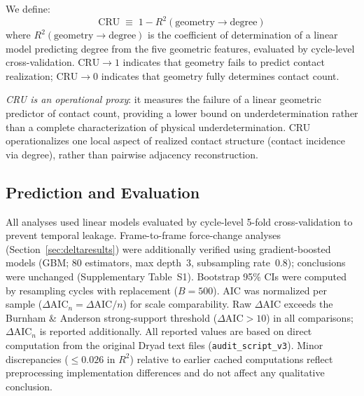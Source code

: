 \documentclass[11pt,a4paper]{article}
\begin{document}
We define:
\begin{equation}
\mathrm{CRU} \;\equiv\; 1 - R^2(\text{geometry} \rightarrow \text{degree})
\end{equation}
where $R^2(\text{geometry} \rightarrow \text{degree})$ is the coefficient of determination of a linear model predicting degree from the five geometric features, evaluated by cycle-level cross-validation.
$\mathrm{CRU} \rightarrow 1$ indicates that geometry fails to predict contact realization; $\mathrm{CRU} \rightarrow 0$ indicates that geometry fully determines contact count.

\textit{CRU is an operational proxy}: it measures the failure of a linear geometric predictor of contact count, providing a lower bound on underdetermination rather than a complete characterization of physical underdetermination. CRU operationalizes one local aspect of realized contact structure (contact incidence via degree), rather than pairwise adjacency reconstruction.

\subsection{Prediction and Evaluation}

All analyses used linear models evaluated by cycle-level 5-fold cross-validation to prevent temporal leakage.
Frame-to-frame force-change analyses (Section~\ref{sec:deltaresults}) were additionally verified using gradient-boosted models (GBM; 80 estimators, max depth~3, subsampling rate~0.8); conclusions were unchanged (Supplementary Table~S1).
Bootstrap 95\% CIs were computed by resampling cycles with replacement ($B=500$).
AIC was normalized per sample ($\Delta\mathrm{AIC}_n = \Delta\mathrm{AIC}/n$) for scale comparability.
Raw $\Delta\mathrm{AIC}$ exceeds the Burnham \& Anderson \cite{burnham2002} strong-support threshold ($\Delta\mathrm{AIC} > 10$) in all comparisons; $\Delta\mathrm{AIC}_n$ is reported additionally.
All reported values are based on direct computation from the original Dryad text files (\texttt{audit\_script\_v3}).
Minor discrepancies ($\leq 0.026$ in $R^2$) relative to earlier cached computations reflect preprocessing implementation differences and do not affect any qualitative conclusion.

\end{document}
